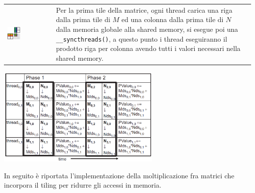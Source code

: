\documentclass[10pt, letterpaper]{report}
\begin{document}
\begin{center}
	\begin{tabular}{>{\centering\arraybackslash}m{3in}>{\arraybackslash}m{3in}}
        \includegraphics[width=0.3\textwidth ]{images/tiling3.png} & Per la prima tile della matrice, ogni thread carica una riga dalla prima tile di $M$ ed una colonna dalla prima tile di $N$ dalla memoria globale alla shared memory, si esegue poi una \texttt{\_\_syncthreads()}, a questo punto i thread eseguiranno il prodotto riga per colonna avendo tutti i valori necessari nella shared memory.
		\\
	\end{tabular}\end{center}\begin{center}
\includegraphics[width=0.6\textwidth ]{images/tiling4.png}
\end{center}
In seguito è riportata l'implementazione della moltiplicazione fra matrici che incorpora il tiling per ridurre gli accessi in memoria.\newpage
\end{document}

